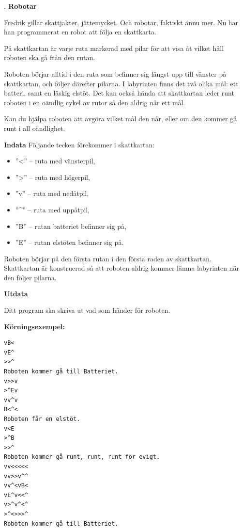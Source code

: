\documentclass[a4paper,12pt]{article}
\newcounter{iii}\setcounter{iii}{0}
\def\i{\bigskip\noindent\refstepcounter{iii}\textbf{\arabic{iii}.} }
\begin{document}
\pagebreak

\i \textbf{Robotar}

Fredrik gillar skattjakter, jättemycket. Och robotar, faktiskt ännu mer. Nu har han programmerat en robot att följa en skattkarta. 

På skattkartan är varje ruta markerad med pilar för att visa åt vilket håll roboten ska gå från den rutan.

Roboten börjar alltid i den ruta som befinner sig längst upp till vänster på skattkartan, och följer därefter pilarna. I labyrinten finns det två olika mål: ett batteri, samt en läskig elstöt. Det kan också hända att skattkartan leder runt roboten i en oändlig cykel av rutor så den aldrig når ett mål.

Kan du hjälpa roboten att avgöra vilket mål den når, eller om den kommer gå runt i all oändlighet.

\textbf{Indata}
Följande tecken förekommer i skattkartan:
\begin{itemize}
\item ''<'' – ruta med vänsterpil,
\item ''>'' – ruta med högerpil,
\item ''v'' – ruta med nedåtpil,
\item ''\^{}'' – ruta med uppåtpil,
\item ''B'' – rutan batteriet befinner sig på,
\item ''E'' – rutan elstöten befinner sig på.
\end{itemize}
Roboten börjar på den första rutan i den första raden av skattkartan. Skattkartan är konstruerad så att roboten aldrig kommer lämna labyrinten när den följer pilarna.

\textbf{Utdata}

Ditt program ska skriva ut vad som händer för roboten. 

\textbf{Körningsexempel:}
\begin{lstlisting}
vB<
vE^
>>^
Roboten kommer gå till Batteriet.
v>>v
>^Ev
vv^v
B<^<
Roboten får en elstöt.
v<E
>^B
>>^
Roboten kommer gå runt, runt, runt för evigt. 
vv<<<<<
vv>>v^^
vv^<vB<
vE^v<<^
v>^v^<^
>^<>>>^
Roboten kommer gå till Batteriet. 
\end{lstlisting}
\end{document}
